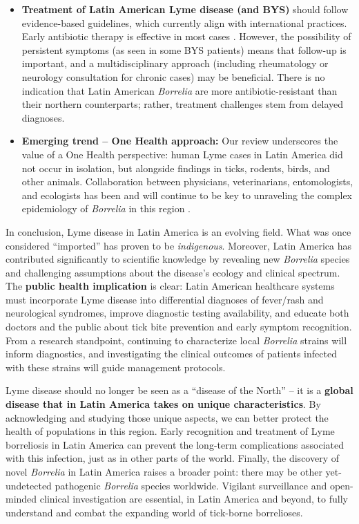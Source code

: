 \documentclass[11pt,letterpaper]{article}
\begin{document}
\begin{itemize}
    \item \textbf{Treatment of Latin American Lyme disease (and BYS)} should follow evidence-based guidelines, which currently align with international practices. Early antibiotic therapy is effective in most cases \citep{Yoshinari2022ar}. However, the possibility of persistent symptoms (as seen in some BYS patients) means that follow-up is important, and a multidisciplinary approach (including rheumatology or neurology consultation for chronic cases) may be beneficial. There is no indication that Latin American \textit{Borrelia} are more antibiotic-resistant than their northern counterparts; rather, treatment challenges stem from delayed diagnoses.

    \item \textbf{Emerging trend – One Health approach:} Our review underscores the value of a One Health perspective: human Lyme cases in Latin America did not occur in isolation, but alongside findings in ticks, rodents, birds, and other animals. Collaboration between physicians, veterinarians, entomologists, and ecologists has been and will continue to be key to unraveling the complex epidemiology of \textit{Borrelia} in this region \citep{Colunga-Salas2022g, Colunga-Salas2022h}.
\end{itemize}

In conclusion, Lyme disease in Latin America is an evolving field. What was once considered “imported” has proven to be \textit{indigenous}. Moreover, Latin America has contributed significantly to scientific knowledge by revealing new \textit{Borrelia} species and challenging assumptions about the disease’s ecology and clinical spectrum. The \textbf{public health implication} is clear: Latin American healthcare systems must incorporate Lyme disease into differential diagnoses of fever/rash and neurological syndromes, improve diagnostic testing availability, and educate both doctors and the public about tick bite prevention and early symptom recognition. From a research standpoint, continuing to characterize local \textit{Borrelia} strains will inform diagnostics, and investigating the clinical outcomes of patients infected with these strains will guide management protocols.

Lyme disease should no longer be seen as a “disease of the North” – it is a \textbf{global disease that in Latin America takes on unique characteristics}. By acknowledging and studying those unique aspects, we can better protect the health of populations in this region. Early recognition and treatment of Lyme borreliosis in Latin America can prevent the long-term complications associated with this infection, just as in other parts of the world. Finally, the discovery of novel \textit{Borrelia} in Latin America raises a broader point: there may be other yet-undetected pathogenic \textit{Borrelia} species worldwide. Vigilant surveillance and open-minded clinical investigation are essential, in Latin America and beyond, to fully understand and combat the expanding world of tick-borne borrelioses.
\end{document}
